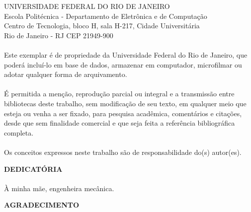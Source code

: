 \pagebreak

      \vspace{0.5cm}

UNIVERSIDADE FEDERAL DO RIO DE JANEIRO \\
Escola Politécnica - Departamento de Eletrônica e de Computação \\
Centro de Tecnologia, bloco H, sala H-217, Cidade Universitária \\
Rio de Janeiro - RJ      CEP 21949-900\\
\vspace{0.5cm}
\paragraph{}Este exemplar é de propriedade da Universidade Federal do Rio de Janeiro, que poderá incluí-lo em base de dados, armazenar em computador, microfilmar ou adotar qualquer forma de arquivamento.
\paragraph{}É permitida a menção, reprodução parcial ou integral e a transmissão entre bibliotecas deste trabalho, sem modificação de seu texto, em qualquer meio que esteja ou venha a ser fixado, para pesquisa acadêmica, comentários e citações, desde que sem finalidade comercial e que seja feita a referência bibliográfica completa.
\paragraph{}Os conceitos expressos neste trabalho são de responsabilidade do(s) autor(es).


\pagebreak

\begin{center}
\textbf{DEDICATÓRIA}
\end{center}
      \vspace{0.5cm}

\paragraph{} À minha mãe, engenheira mecânica.

\pagebreak


\begin{center}
\textbf{AGRADECIMENTO}
\end{center}
      \vspace{0.5cm}



